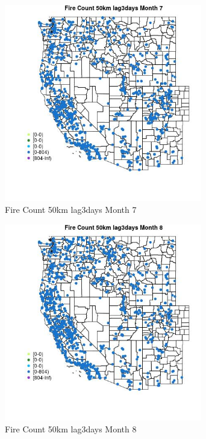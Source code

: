 \begin{figure} 
\centering  
\includegraphics[width=0.77\textwidth]{Code_Outputs/Report_ML_input_PM25_Step4_part_f_de_duplicated_aves_prioritize_24hr_obswNAs_MapObsMo7Fire_Count_50km_lag3days.jpg} 
\caption{\label{fig:Report_ML_input_PM25_Step4_part_f_de_duplicated_aves_prioritize_24hr_obswNAsMapObsMo7Fire_Count_50km_lag3days}Fire Count 50km lag3days Month 7} 
\end{figure} 
 

\begin{figure} 
\centering  
\includegraphics[width=0.77\textwidth]{Code_Outputs/Report_ML_input_PM25_Step4_part_f_de_duplicated_aves_prioritize_24hr_obswNAs_MapObsMo8Fire_Count_50km_lag3days.jpg} 
\caption{\label{fig:Report_ML_input_PM25_Step4_part_f_de_duplicated_aves_prioritize_24hr_obswNAsMapObsMo8Fire_Count_50km_lag3days}Fire Count 50km lag3days Month 8} 
\end{figure} 
 

